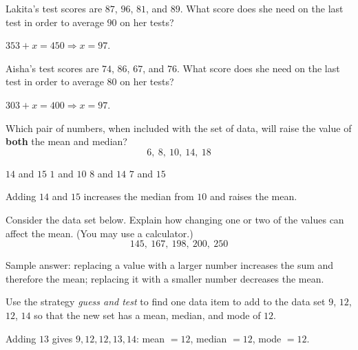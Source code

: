 \newpage



\question[5]
Lakita's test scores are $87$, $96$, $81$, and $89$. What score does she need on the last test in order to average $90$ on her tests?
\begin{solution}
  $353+x=450\Rightarrow x=97$.
\end{solution}

\question[5]
Aisha's test scores are $74$, $86$, $67$, and $76$. What score does she need on the last test in order to average $80$ on her tests?
\begin{solution}
  $303+x=400\Rightarrow x=97$.
\end{solution}

\question[5]
Which pair of numbers, when included with the set of data, will raise the value of \textbf{both} the mean and median?
\[
  6,\ 8,\ 10,\ 14,\ 18
\]
\begin{choices}
  \CorrectChoice $14$ and $15$
  \choice $1$ and $10$
  \choice $8$ and $14$
  \choice $7$ and $15$
\end{choices}
\begin{solution}
  Adding $14$ and $15$ increases the median from $10$ and raises the mean.
\end{solution}



\newpage



\question[10]
Consider the data set below. Explain how changing one or two of the values can affect the mean. (You may use a calculator.)
\[
  145,\ 167,\ 198,\ 200,\ 250
\]
\begin{solutionorbox}[1.8in]
  Sample answer: replacing a value with a larger number increases the sum and therefore the mean; replacing it with a smaller number decreases the mean.
\end{solutionorbox}

\question[5]
Use the strategy \emph{guess and test} to find one data item to add to the data set $9$, $12$, $12$, $14$ so that the new set has a mean, median, and mode of $12$.
\begin{solution}
  Adding $13$ gives $9,12,12,13,14$: mean $=12$, median $=12$, mode $=12$.
\end{solution}

